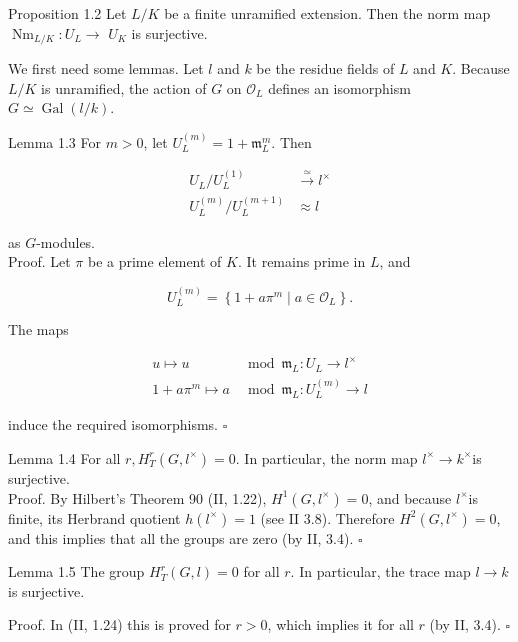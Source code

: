\documentclass[10pt]{article}
\begin{document}
Proposition 1.2 Let $L / K$ be a finite unramified extension. Then the norm map $\operatorname{Nm}_{L / K}: U_{L} \rightarrow$ $U_{K}$ is surjective.

We first need some lemmas. Let $l$ and $k$ be the residue fields of $L$ and $K$. Because $L / K$ is unramified, the action of $G$ on $\mathcal{O}_{L}$ defines an isomorphism $G \simeq \operatorname{Gal}(l / k)$.

Lemma 1.3 For $m>0$, let $U_{L}^{(m)}=1+\mathfrak{m}_{L}^{m}$. Then

$$
\begin{aligned}
U_{L} / U_{L}^{(1)} & \xrightarrow{\simeq} l^{\times} \\
U_{L}^{(m)} / U_{L}^{(m+1)} & \approx l
\end{aligned}
$$

as $G$-modules.\\
Proof. Let $\pi$ be a prime element of $K$. It remains prime in $L$, and

$$
U_{L}^{(m)}=\left\{1+a \pi^{m} \mid a \in \mathcal{O}_{L}\right\} .
$$

The maps

$$
\begin{aligned}
u \mapsto u & \bmod \mathfrak{m}_{L}: U_{L} \rightarrow l^{\times} \\
1+a \pi^{m} \mapsto a & \bmod \mathfrak{m}_{L}: U_{L}^{(m)} \rightarrow l
\end{aligned}
$$

induce the required isomorphisms. \(\square\)

Lemma 1.4 For all $r, H_{T}^{r}\left(G, l^{\times}\right)=0$. In particular, the norm map $l^{\times} \rightarrow k^{\times}$is surjective.\\
Proof. By Hilbert's Theorem 90 (II, 1.22), $H^{1}\left(G, l^{\times}\right)=0$, and because $l^{\times}$is finite, its Herbrand quotient $h\left(l^{\times}\right)=1$ (see II 3.8). Therefore $H^{2}\left(G, l^{\times}\right)=0$, and this implies that all the groups are zero (by II, 3.4). \(\square\)

Lemma 1.5 The group $H_{T}^{r}(G, l)=0$ for all $r$. In particular, the trace map $l \rightarrow k$ is surjective.

Proof. In (II, 1.24) this is proved for $r>0$, which implies it for all $r$ (by II, 3.4). \(\square\)
\end{document}
